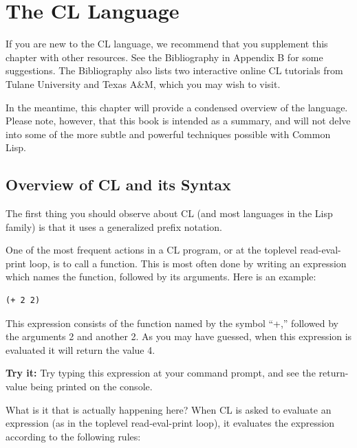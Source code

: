 \chapter{The CL Language}

If you are new to the CL language, we recommend that you supplement this chapter with
other resources. See the Bibliography in Appendix B for some suggestions. The Bibliography also lists two interactive online CL tutorials from Tulane University and Texas A\&M,
which you may wish to visit.

In the meantime, this chapter will provide a condensed overview of the language. Please
note, however, that this book is intended as a summary, and will not delve into some of the
more subtle and powerful techniques possible with Common Lisp.

\section{Overview of CL and its Syntax}

The first thing you should observe about CL (and most languages in the Lisp family) is
that it uses a generalized prefix notation.

One of the most frequent actions in a CL program, or at the toplevel read-eval-print
loop, is to call a function. This is most often done by writing an expression which names
the function, followed by its arguments. Here is an example:

\begin{verbatim}
(+ 2 2)
\end{verbatim}

This expression consists of the function named by the symbol ``+,'' followed by the arguments
2 and another 2. As you may have guessed, when this expression is evaluated it will return
the value 4.

\textbf{Try it:} Try typing this expression at your command prompt, and see the return-value
being printed on the console.

What is it that is actually happening here? When CL is asked to evaluate an expression (as in the toplevel read-eval-print loop), it evaluates the expression according to the
following rules:

